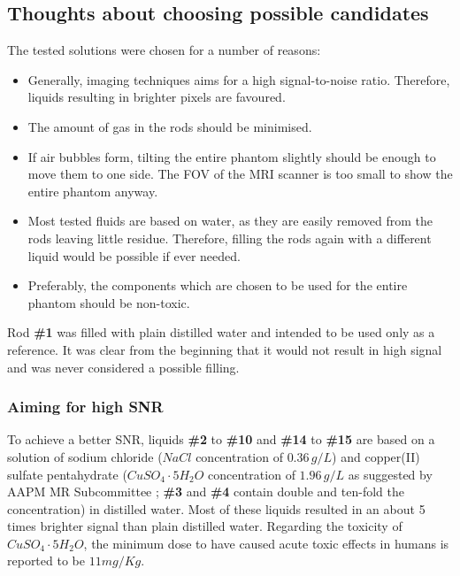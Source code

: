 \subsection{Thoughts about choosing possible candidates}

The tested solutions were chosen for a number of reasons:
\begin{itemize}
\item Generally, imaging techniques aims for a high signal-to-noise ratio. Therefore, liquids resulting in brighter pixels are favoured.
\item The amount of gas in the rods should be minimised.
\item If air bubbles form, tilting the entire phantom slightly should be enough to move them to one side. The FOV of the MRI scanner is too small to show the entire phantom anyway.
\item Most tested fluids are based on water, as they are easily removed from the rods leaving little residue.
Therefore, filling the rods again with a different liquid would be possible if ever needed.
\item Preferably, the components which are chosen to be used for the entire phantom should be non-toxic.
\end{itemize}

\vspace{1cm}

Rod \textbf{\#1} was filled with plain distilled water and intended to be used only as a reference.
It was clear from the beginning that it would not result in high signal and was never considered a possible filling.

\subsubsection{Aiming for high SNR}
To achieve a better SNR, liquids \textbf{\#2} to \textbf{\#10} and \textbf{\#14} to \textbf{\#15} are based on a solution of sodium chloride ($NaCl$ concentration of $0.36 \, g/L$) and copper(II) sulfate pentahydrate ($CuSO_4\cdot5H_2O$ concentration of $1.96 \, g/L$ as suggested by AAPM MR Subcommittee \cite{Jackson2009};  \textbf{\#3} and \textbf{\#4} contain double and ten-fold the concentration) in distilled water.
Most of these liquids resulted in an about 5 times brighter signal than plain distilled water.
Regarding the toxicity of $CuSO_4\cdot5H_2O$, the minimum dose to have caused acute toxic effects in humans is reported to be $11 mg/Kg$.

